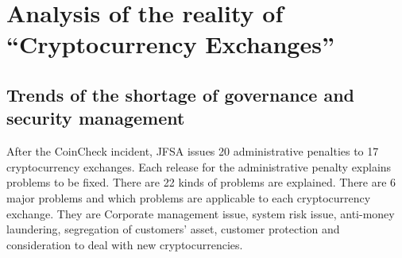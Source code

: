 \section{Analysis of the reality of ``Cryptocurrency Exchanges''}

\subsection{Trends of the shortage of governance and security management}
After the CoinCheck incident, JFSA issues 20 administrative penalties to 17 cryptocurrency exchanges.
Each release for the administrative penalty explains problems to be fixed. There are 22 kinds of problems are explained. There are 6 major problems and which problems are applicable to each cryptocurrency exchange.
They are Corporate management issue, system risk issue, anti-money laundering, segregation of customers' asset, customer protection and
consideration to deal with new cryptocurrencies.
